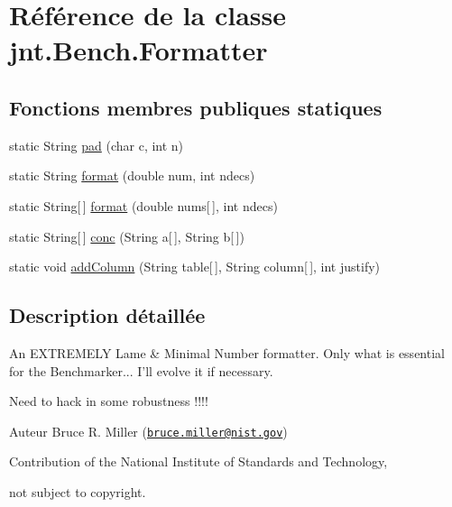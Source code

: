\hypertarget{classjnt_1_1Bench_1_1Formatter}{\section{Référence de la classe jnt.\-Bench.\-Formatter}
\label{classjnt_1_1Bench_1_1Formatter}
}
\subsection*{Fonctions membres publiques statiques}
\begin{DoxyCompactItemize}
\item 
static String \hyperlink{classjnt_1_1Bench_1_1Formatter_af30bb48b07f34b681e21b37a9d766ecc}{pad} (char c, int n)
\item 
static String \hyperlink{classjnt_1_1Bench_1_1Formatter_ae3147e8836ccfa0eb5469ea45eadbb13}{format} (double num, int ndecs)
\item 
static String\mbox{[}$\,$\mbox{]} \hyperlink{classjnt_1_1Bench_1_1Formatter_a184715fab7b1e6ebeef5aed1ece39f4e}{format} (double nums\mbox{[}$\,$\mbox{]}, int ndecs)
\item 
static String\mbox{[}$\,$\mbox{]} \hyperlink{classjnt_1_1Bench_1_1Formatter_a1dac5b83a4871a9bda8ebfc1b877c68f}{conc} (String a\mbox{[}$\,$\mbox{]}, String b\mbox{[}$\,$\mbox{]})
\item 
static void \hyperlink{classjnt_1_1Bench_1_1Formatter_ac5046dd97ae66da89e0ce51bd67a8760}{add\-Column} (String table\mbox{[}$\,$\mbox{]}, String column\mbox{[}$\,$\mbox{]}, int justify)
\end{DoxyCompactItemize}


\subsection{Description détaillée}
An E\-X\-T\-R\-E\-M\-E\-L\-Y Lame \& Minimal Number formatter. Only what is essential for the Benchmarker... I'll evolve it if necessary.

Need to hack in some robustness !!!!

\begin{DoxyAuthor}{Auteur}
Bruce R. Miller (\href{mailto:bruce.miller@nist.gov}{\tt bruce.\-miller@nist.\-gov}) 

Contribution of the National Institute of Standards and Technology, 

not subject to copyright. 
\end{DoxyAuthor}


